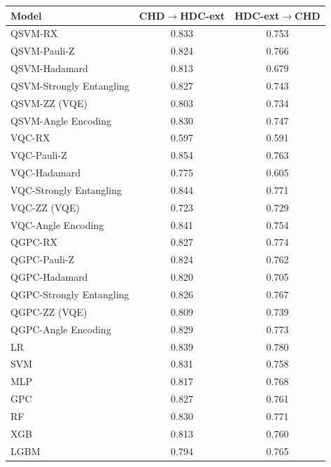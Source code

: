 \begin{tabular}{lcc}
\toprule
Model & CHD$\rightarrow$HDC-ext & HDC-ext$\rightarrow$CHD \\
\midrule
QSVM-RX & 0.833 & 0.753 \\
QSVM-Pauli-Z & 0.824 & 0.766 \\
QSVM-Hadamard & 0.813 & 0.679 \\
QSVM-Strongly Entangling & 0.827 & 0.743 \\
QSVM-ZZ (VQE) & 0.803 & 0.734 \\
QSVM-Angle Encoding & 0.830 & 0.747 \\
VQC-RX & 0.597 & 0.591 \\
VQC-Pauli-Z & 0.854 & 0.763 \\
VQC-Hadamard & 0.775 & 0.605 \\
VQC-Strongly Entangling & 0.844 & 0.771 \\
VQC-ZZ (VQE) & 0.723 & 0.729 \\
VQC-Angle Encoding & 0.841 & 0.754 \\
QGPC-RX & 0.827 & 0.774 \\
QGPC-Pauli-Z & 0.824 & 0.762 \\
QGPC-Hadamard & 0.820 & 0.705 \\
QGPC-Strongly Entangling & 0.826 & 0.767 \\
QGPC-ZZ (VQE) & 0.809 & 0.739 \\
QGPC-Angle Encoding & 0.829 & 0.773 \\
LR & 0.839 & 0.780 \\
SVM & 0.831 & 0.758 \\
MLP & 0.817 & 0.768 \\
GPC & 0.827 & 0.761 \\
RF & 0.830 & 0.771 \\
XGB & 0.813 & 0.760 \\
LGBM & 0.794 & 0.765 \\
\bottomrule
\end{tabular}
